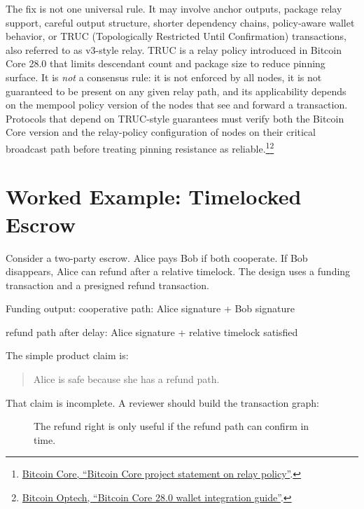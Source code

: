 The fix is not one universal rule. It may involve anchor outputs, package relay support, careful output structure, shorter dependency chains, policy-aware wallet behavior, or TRUC (Topologically Restricted Until Confirmation) transactions, also referred to as v3-style relay. TRUC is a relay policy introduced in Bitcoin Core 28.0 that limits descendant count and package size to reduce pinning surface. It is \emph{not} a consensus rule: it is not enforced by all nodes, it is not guaranteed to be present on any given relay path, and its applicability depends on the mempool policy version of the nodes that see and forward a transaction. Protocols that depend on TRUC-style guarantees must verify both the Bitcoin Core version and the relay-policy configuration of nodes on their critical broadcast path before treating pinning resistance as reliable.\footnote{\href{https://bitcoincore.org/en/2025/06/06/relay-statement/}{Bitcoin Core, ``Bitcoin Core project statement on relay policy''}.}\footnote{\href{https://bitcoinops.org/en/bitcoin-core-28-wallet-integration-guide/}{Bitcoin Optech, ``Bitcoin Core 28.0 wallet integration guide''}.}

\section{Worked Example: Timelocked Escrow}

Consider a two-party escrow. Alice pays Bob if both cooperate. If Bob disappears, Alice can refund after a relative timelock. The design uses a funding transaction and a presigned refund transaction.

\begin{codeblock}
Funding output:
    cooperative path:
        Alice signature + Bob signature

    refund path after delay:
        Alice signature + relative timelock satisfied
\end{codeblock}

The simple product claim is:

\begin{quote}
Alice is safe because she has a refund path.
\end{quote}

That claim is incomplete. A reviewer should build the transaction graph:

\begin{figure}[htbp]
\centering
{}
\caption{The refund right is only useful if the refund path can confirm in time.}
\end{figure}

